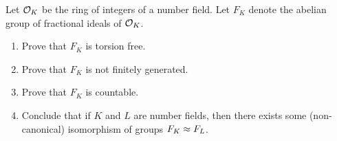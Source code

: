 \begin{example}
%

\end{example}

\begin{exercise}
	Let $\mathcal{O}_K$ be the ring of integers of a number field.
	Let $F_K$ denote the abelian group of fractional ideals of $\mathcal{O}_K$.
	\begin{enumerate}
		\item Prove that $F_K$ is torsion free.
		\item Prove that $F_K$ is not finitely generated.
		\item Prove that $F_K$ is countable.
		\item Conclude that if $K$ and $L$ are number fields, then there
		exists some (non-canonical) isomorphism of groups $F_K\approx F_L$.
	\end{enumerate}
\end{exercise}
